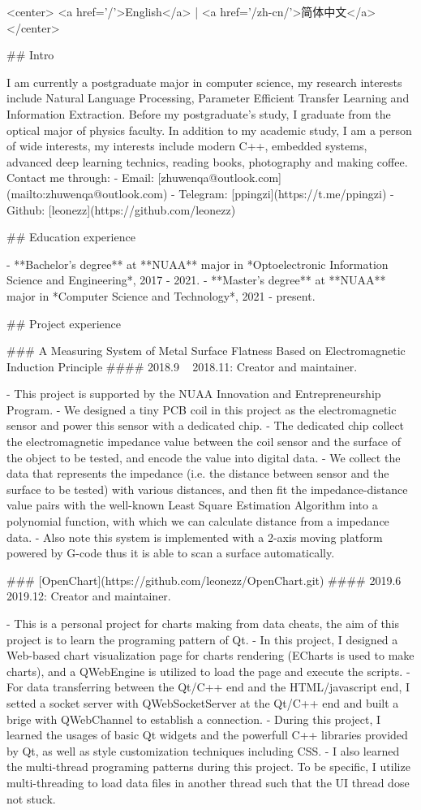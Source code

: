 {%
<center>
<a href='/'>English</a> | <a href='/zh-cn/'>简体中文</a>
</center>
{%

## Intro

I am currently a postgraduate major in computer science, my research interests include Natural Language Processing, Parameter Efficient Transfer Learning and Information Extraction. Before my postgraduate's study, I graduate from the optical major of physics faculty.
In addition to my academic study, I am a person of wide interests, my interests include modern C++, embedded systems, advanced deep learning technics, reading books, photography and making coffee.
Contact me through:
- Email: [zhuwenqa@outlook.com](mailto:zhuwenqa@outlook.com)
- Telegram: [ppingzi](https://t.me/ppingzi)
- Github: [leonezz](https://github.com/leonezz)

## Education experience

- **Bachelor's degree** at **NUAA** major in *Optoelectronic Information Science and Engineering*, 2017 - 2021.
- **Master's degree** at **NUAA** major in *Computer Science and Technology*, 2021 - present.

## Project experience

### A Measuring System of Metal Surface Flatness Based on Electromagnetic Induction Principle
#### 2018.9 ~ 2018.11: Creator and maintainer.

- This project is supported by the NUAA Innovation and Entrepreneurship Program.
- We designed a tiny PCB coil in this project as the electromagnetic sensor and power this sensor with a dedicated chip.
- The dedicated chip collect the electromagnetic impedance value between the coil sensor and the surface of the object to be tested, and encode the value into digital data.
- We collect the data that represents the impedance (i.e. the distance between sensor and the surface to be tested) with various distances, and then fit the impedance-distance value pairs with the well-known Least Square Estimation Algorithm into a polynomial function, with which we can calculate distance from a impedance data.
- Also note this system is implemented with a 2-axis moving platform powered by G-code thus it is able to scan a surface automatically.

### [OpenChart](https://github.com/leonezz/OpenChart.git)
#### 2019.6 ~ 2019.12: Creator and maintainer.

- This is a personal project for charts making from data cheats, the aim of this project is to learn the programing pattern of Qt.
- In this project, I designed a Web-based chart visualization page for charts rendering (ECharts is used to make charts), and a QWebEngine is utilized to load the page and execute the scripts.
- For data transferring between the Qt/C++ end and the HTML/javascript end, I setted a socket server with QWebSocketServer at the Qt/C++ end and built a brige with QWebChannel to establish a connection.
- During this project, I learned the usages of basic Qt widgets and the powerfull C++ libraries provided by Qt, as well as style customization techniques including CSS.
- I also learned the multi-thread programing patterns during this project. To be specific, I utilize multi-threading to load data files in another thread such that the UI thread dose not stuck.

}}
